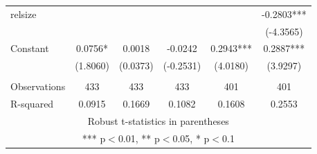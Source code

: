 \documentclass[12pt]{article}
\begin{document}
\begin{adjustbox}{max width=\textwidth}
\begin{tabular}{lccccc}
   relsize &  &  &  &  & -0.2803*** \\
	&  &  &  &  & (-4.3565) \\
   Constant & 0.0756* & 0.0018 & -0.0242 & 0.2943*** & 0.2887*** \\
	& (1.8060) & (0.0373) & (-0.2531) & (4.0180) & (3.9297) \\
	&  &  &  &  &  \\
   Observations & 433 & 433 & 433 & 401 & 401 \\
	R-squared & 0.0915 & 0.1669 & 0.1082 & 0.1608 & 0.2553 \\ \hline
   \multicolumn{6}{c}{ Robust t-statistics in parentheses} \\
   \multicolumn{6}{c}{ *** p$<$0.01, ** p$<$0.05, * p$<$0.1} \\
   \end{tabular}
\end{adjustbox}
\printbibliography
 
\end{document}
